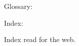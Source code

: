 \documentclass{test-ownprim-class}
\begin{document}
Glossary: \ownprimglossary\par
Index: \ownprimindex
\ifdefined\printindex\par Index read for the web.\fi
\end{document}
